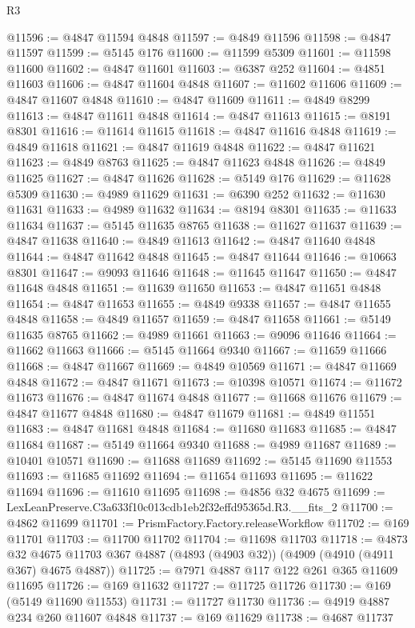 \begin{lexlean}{R3}
\begin{coremodule}
@11596 := @4847 @11594 @4848
@11597 := @4849 @11596
@11598 := @4847 @11597
@11599 := @5145 @176
@11600 := @11599 @5309
@11601 := @11598 @11600
@11602 := @4847 @11601
@11603 := @6387 @252
@11604 := @4851 @11603
@11606 := @4847 @11604 @4848
@11607 := @11602 @11606
@11609 := @4847 @11607 @4848
@11610 := @4847 @11609
@11611 := @4849 @8299
@11613 := @4847 @11611 @4848
@11614 := @4847 @11613
@11615 := @8191 @8301
@11616 := @11614 @11615
@11618 := @4847 @11616 @4848
@11619 := @4849 @11618
@11621 := @4847 @11619 @4848
@11622 := @4847 @11621
@11623 := @4849 @8763
@11625 := @4847 @11623 @4848
@11626 := @4849 @11625
@11627 := @4847 @11626
@11628 := @5149 @176
@11629 := @11628 @5309
@11630 := @4989 @11629
@11631 := @6390 @252
@11632 := @11630 @11631
@11633 := @4989 @11632
@11634 := @8194 @8301
@11635 := @11633 @11634
@11637 := @5145 @11635 @8765
@11638 := @11627 @11637
@11639 := @4847 @11638
@11640 := @4849 @11613
@11642 := @4847 @11640 @4848
@11644 := @4847 @11642 @4848
@11645 := @4847 @11644
@11646 := @10663 @8301
@11647 := @9093 @11646
@11648 := @11645 @11647
@11650 := @4847 @11648 @4848
@11651 := @11639 @11650
@11653 := @4847 @11651 @4848
@11654 := @4847 @11653
@11655 := @4849 @9338
@11657 := @4847 @11655 @4848
@11658 := @4849 @11657
@11659 := @4847 @11658
@11661 := @5149 @11635 @8765
@11662 := @4989 @11661
@11663 := @9096 @11646
@11664 := @11662 @11663
@11666 := @5145 @11664 @9340
@11667 := @11659 @11666
@11668 := @4847 @11667
@11669 := @4849 @10569
@11671 := @4847 @11669 @4848
@11672 := @4847 @11671
@11673 := @10398 @10571
@11674 := @11672 @11673
@11676 := @4847 @11674 @4848
@11677 := @11668 @11676
@11679 := @4847 @11677 @4848
@11680 := @4847 @11679
@11681 := @4849 @11551
@11683 := @4847 @11681 @4848
@11684 := @11680 @11683
@11685 := @4847 @11684
@11687 := @5149 @11664 @9340
@11688 := @4989 @11687
@11689 := @10401 @10571
@11690 := @11688 @11689
@11692 := @5145 @11690 @11553
@11693 := @11685 @11692
@11694 := @11654 @11693
@11695 := @11622 @11694
@11696 := @11610 @11695
@11698 := @4856 @32 @4675
@11699 := LexLeanPreserve.C3a633f10c013cdb1eb2f32effd95365d.R3.__fits_2
@11700 := @4862 @11699
@11701 := PrismFactory.Factory.releaseWorkflow
@11702 := @169 @11701
@11703 := @11700 @11702
@11704 := @11698 @11703
@11718 := @4873
    @32
    @4675
    @11703
    @367
    @4887
    (@4893 (@4903 @32))
    (@4909 (@4910 (@4911 @367) @4675 @4887))
@11725 := @7971 @4887 @117 @122 @261 @365 @11609 @11695
@11726 := @169 @11632
@11727 := @11725 @11726
@11730 := @169 (@5149 @11690 @11553)
@11731 := @11727 @11730
@11736 := @4919 @4887 @234 @260 @11607 @4848
@11737 := @169 @11629
@11738 := @4687 @11737

\end{coremodule}
\end{lexlean}
